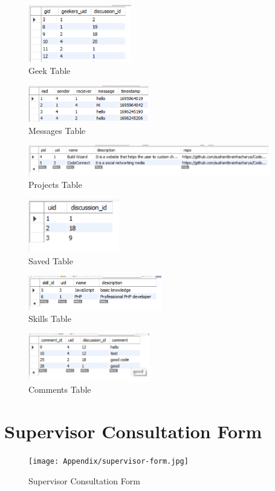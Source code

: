     \begin{figure}[H]
        \centering
            \includegraphics[width=170px]{db_img/geek.png}
        \caption{Geek Table}
    \end{figure}
    
    \begin{figure}[H]
        \centering
            \includegraphics[width=200px]{db_img/messages.png}
        \caption{Messages Table}
    \end{figure}
    
    \begin{figure}[H]
        \centering
            \includegraphics[width=400px]{db_img/projects.png}
        \caption{Projects Table}
    \end{figure}
    
    \begin{figure}[H]
        \centering
            \includegraphics[width=150px]{db_img/saved.png}
        \caption{Saved Table}
    \end{figure}
    
    \begin{figure}[H]
        \centering
            \includegraphics[width=220px]{db_img/skills.png}
        \caption{Skills Table}
    \end{figure}
    
    \begin{figure}[H]
        \centering
            \includegraphics[width=200px]{db_img/comments.png}
        \caption{Comments Table}
    \end{figure}
\section{Supervisor Consultation Form}
\begin{figure}[H]
    \centering
    \texttt{[image: Appendix/supervisor-form.jpg]}
    \caption{Supervisor Consultation Form}
\end{figure}


